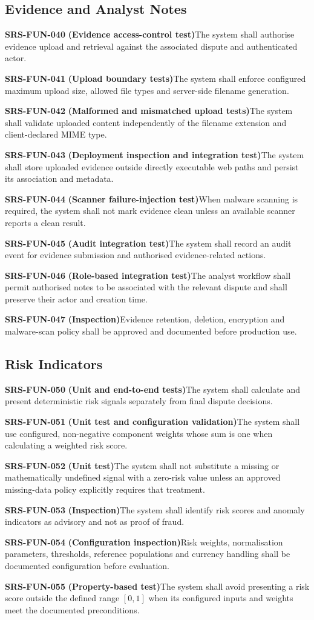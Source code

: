 \documentclass[11pt,a4paper]{article}
\newcommand{\req}[3]{%
    \par\noindent\textbf{\color{ADGBlue}#1}\quad
    \textbf{(#3)}\enspace #2\par\smallskip
}
\begin{document}
\subsection{Evidence and Analyst Notes}

\req{SRS-FUN-040}{The system shall authorise evidence upload and retrieval against the associated dispute and authenticated actor.}{Evidence access-control test}
\req{SRS-FUN-041}{The system shall enforce configured maximum upload size, allowed file types and server-side filename generation.}{Upload boundary tests}
\req{SRS-FUN-042}{The system shall validate uploaded content independently of the filename extension and client-declared MIME type.}{Malformed and mismatched upload tests}
\req{SRS-FUN-043}{The system shall store uploaded evidence outside directly executable web paths and persist its association and metadata.}{Deployment inspection and integration test}
\req{SRS-FUN-044}{When malware scanning is required, the system shall not mark evidence clean unless an available scanner reports a clean result.}{Scanner failure-injection test}
\req{SRS-FUN-045}{The system shall record an audit event for evidence submission and authorised evidence-related actions.}{Audit integration test}
\req{SRS-FUN-046}{The analyst workflow shall permit authorised notes to be associated with the relevant dispute and shall preserve their actor and creation time.}{Role-based integration test}
\req{SRS-FUN-047}{Evidence retention, deletion, encryption and malware-scan policy shall be approved and documented before production use.}{Inspection}

\subsection{Risk Indicators}

\req{SRS-FUN-050}{The system shall calculate and present deterministic risk signals separately from final dispute decisions.}{Unit and end-to-end tests}
\req{SRS-FUN-051}{The system shall use configured, non-negative component weights whose sum is one when calculating a weighted risk score.}{Unit test and configuration validation}
\req{SRS-FUN-052}{The system shall not substitute a missing or mathematically undefined signal with a zero-risk value unless an approved missing-data policy explicitly requires that treatment.}{Unit test}
\req{SRS-FUN-053}{The system shall identify risk scores and anomaly indicators as advisory and not as proof of fraud.}{Inspection}
\req{SRS-FUN-054}{Risk weights, normalisation parameters, thresholds, reference populations and currency handling shall be documented configuration before evaluation.}{Configuration inspection}
\req{SRS-FUN-055}{The system shall avoid presenting a risk score outside the defined range \([0,1]\) when its configured inputs and weights meet the documented preconditions.}{Property-based test}
\end{document}
